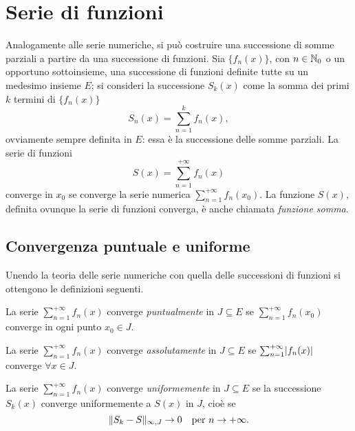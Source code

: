 \chapter{Serie di funzioni}
Analogamente alle serie numeriche, si può costruire una successione di somme parziali a partire da una successione di funzioni. Sia $\{f_n(x)\}$, con $n\in\mathbb{N}_0$ o un opportuno sottoinsieme, una successione di funzioni definite tutte su un medesimo insieme $E$; si consideri la successione $S_k(x)$ come la somma dei primi $k$ termini di $\{f_n(x)\}$
\[
S_n(x)=\sum_{n=1}^kf_n(x),
\]
ovviamente sempre definita in $E$: essa è la successione delle somme parziali.
La serie di funzioni
\[
S(x)=\sum_{n=1}^{+\infty}f_n(x)
\]
converge in $x_0$ se converge la serie numerica $\sum_{n=1}^{+\infty}f_n(x_0)$. La funzione $S(x)$, definita ovunque la serie di funzioni converga, è anche chiamata \emph{funzione somma}.

\section{Convergenza puntuale e uniforme}
Unendo la teoria delle serie numeriche con quella delle successioni di funzioni si ottengono le definizioni seguenti.
\begin{definizione}
La serie $\sum_{n=1}^{+\infty}f_n(x)$ converge \emph{puntualmente} in $J\subseteq E$ se $\sum_{n=1}^{+\infty}f_n(x_0)$ converge in ogni punto $x_0\in J$.
\end{definizione}
\begin{definizione}
La serie $\sum_{n=1}^{+\infty}f_n(x)$ converge \emph{assolutamente} in $J\subseteq E$ se $\sum_{n=1}^{+\infty}\lvert f_n(x)\rvert$ converge $\forall x\in J$.
\end{definizione}
\begin{definizione}
La serie $\sum_{n=1}^{+\infty}f_n(x)$ converge \emph{uniformemente} in $J\subseteq E$ se la successione $S_k(x)$ converge uniformemente a $S(x)$ in $J$, cioè se
\[
\lVert S_k-S\rVert_{\infty,J}\to 0\quad\text{per }n\to+\infty.
\]
\end{definizione}

